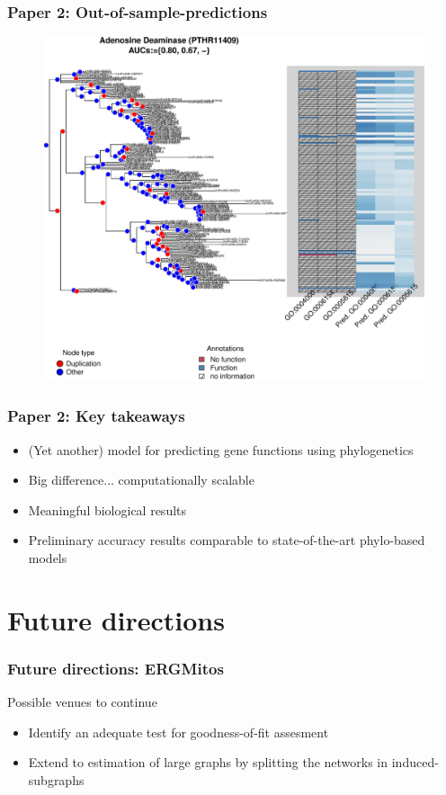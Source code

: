 \documentclass[aspectratio=169, 10pt]{beamer}\usepackage[]{graphicx}\usepackage[]{color}
\begin{document}
\begin{frame}
\frametitle{Paper 2: Out-of-sample-predictions}

\begin{figure}
\centering
\includegraphics[width=.65\linewidth]{out-of-sample1-1.pdf}
\end{figure}

\end{frame}

\begin{frame}
\frametitle{Paper 2: Key takeaways}
\pause
\begin{itemize}[<+->]
\item (Yet another) model for predicting gene functions using phylogenetics
\item Big difference... computationally scalable
\item Meaningful biological results
\item Preliminary accuracy results comparable to state-of-the-art phylo-based
models
\end{itemize}
\end{frame}

\section{Future directions}
\begin{frame}
\frametitle{Future directions: ERGMitos}

Possible venues to continue\pause

\begin{itemize}[<+->]
\item Identify an adequate test for goodness-of-fit assesment
\item Extend to estimation of large graphs by splitting the networks in induced-subgraphs
\end{itemize}

\end{frame}
\end{document}

